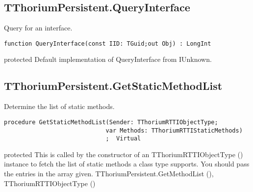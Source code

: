 \subsection{TThoriumPersistent.QueryInterface}
\label{thoriumcorepkg:thorium:tthoriumpersistent:queryinterface}
\begin{FPCList}
\Synopsis
Query for an interface.\Declaration 

\begin{verbatim}
function QueryInterface(const IID: TGuid;out Obj) : LongInt
\end{verbatim}
\Visibility
protected
\Description
Default implementation of QueryInterface from IUnknown.\end{FPCList}
\subsection{TThoriumPersistent.GetStaticMethodList}
\label{thoriumcorepkg:thorium:tthoriumpersistent:getstaticmethodlist}
\begin{FPCList}
\Synopsis
Determine the list of static methods.\Declaration 

\begin{verbatim}
procedure GetStaticMethodList(Sender: TThoriumRTTIObjectType;
                             var Methods: TThoriumRTTIStaticMethods)
                             ;  Virtual
\end{verbatim}
\Visibility
protected
\Description
This is called by the constructor of an TThoriumRTTIObjectType (\pageref{thoriumcorepkg:thorium:tthoriumrttiobjecttype}) instance to fetch the list of static methods a class type supports. You should pass the entries in the array given.\SeeAlso
TThoriumPersistent.GetMethodList (\pageref{thoriumcorepkg:thorium:tthoriumpersistent:getmethodlist}),
TThoriumRTTIObjectType (\pageref{thoriumcorepkg:thorium:tthoriumrttiobjecttype})\end{FPCList}
